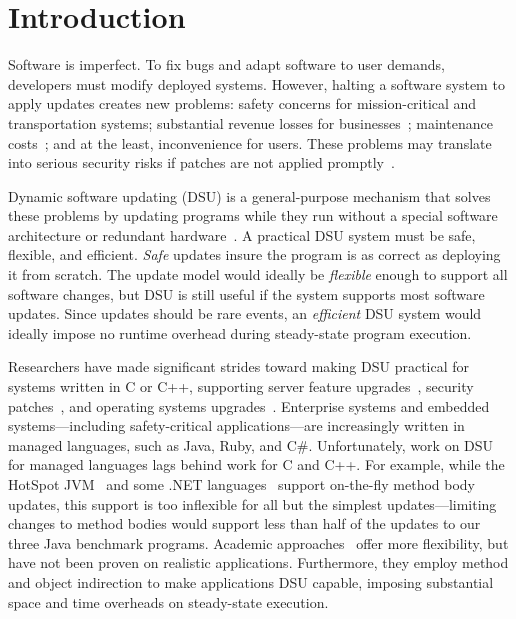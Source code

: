 \documentclass[9pt]{sigplanconf}
\begin{document}

\section{Introduction}

Software is imperfect.  To fix bugs and adapt software to user
demands, developers must modify deployed systems.  However, halting a
software system to apply updates creates new problems: safety concerns
for mission-critical and transportation systems; substantial revenue
losses for businesses~\cite{gartner98downtime,roc1}; maintenance
costs~\cite{zorn05}; and at the least, inconvenience for users. These
problems may translate into serious security risks if patches are not
applied promptly~\cite{altekar05opus,ksplice}.  

Dynamic software updating (DSU) is a general-purpose mechanism that
solves these problems by updating programs while they run without a
special software architecture or redundant
hardware~\cite{kspliceslashdot08}. A practical DSU system must be safe,
flexible, and efficient.  \emph{Safe} updates insure the program is as
correct as deploying it from scratch.  The update model would ideally
be \emph{flexible} enough to support all software changes, but DSU is
still useful if the system supports most software updates.  Since
updates should be rare events, an \emph{efficient} DSU system would
ideally impose no 
runtime overhead during steady-state program execution.

Researchers have made significant strides toward making DSU practical
for systems written in C or C++, supporting server feature
upgrades~\cite{neamtiu06dsu,chen:icse07,upstare}, security
patches~\cite{altekar05opus}, and operating systems
upgrades~\cite{K42reconfig,k42usenix,baumann07reboots,dynamos_eurosys_07,chen06vee,ksplice}.
Enterprise systems and embedded systems---including safety-critical
applications---are increasingly written in managed languages, such as
Java, Ruby, and C\#.  Unfortunately, work on DSU for managed languages
lags behind work for C and C++.  For example, while the HotSpot
JVM~\cite{JVMhotswap} and some .NET languages~\cite{VSEnC} support
on-the-fly method body updates, this support is too inflexible for all
but the simplest updates---limiting changes to method bodies would
support less than half of the updates
to our three Java benchmark programs.  Academic
approaches~\cite{ritzau00dynamic,Mala00a,orso:java,bierman08upgradej} offer more
flexibility, but have not been proven on realistic applications.
Furthermore, they employ method
and object indirection to make applications DSU capable, imposing substantial space
and time overheads on steady-state execution.
\end{document}
